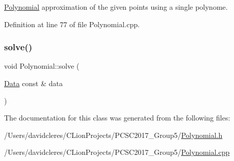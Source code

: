 \mbox{\hyperlink{class_polynomial}{Polynomial}} approximation of the given points using a single polynome. 



Definition at line 77 of file Polynomial.\+cpp.

\mbox{\label{class_polynomial_a15351ca59ae2e3a6a8b8b1ec4e23a924}} 
\subsubsection{\texorpdfstring{solve()}{solve()}\hspace{0.1cm}{\footnotesize\ttfamily [3/3]}}
{\footnotesize\ttfamily void Polynomial\+::solve (\begin{DoxyParamCaption}\item[{\mbox{\hyperlink{struct_data}{Data}} const \&}]{data }\end{DoxyParamCaption})}



The documentation for this class was generated from the following files\+:\begin{DoxyCompactItemize}
\item 
/\+Users/davidcleres/\+C\+Lion\+Projects/\+P\+C\+S\+C2017\+\_\+\+Group5/\mbox{\hyperlink{_polynomial_8h}{Polynomial.\+h}}\item 
/\+Users/davidcleres/\+C\+Lion\+Projects/\+P\+C\+S\+C2017\+\_\+\+Group5/\mbox{\hyperlink{_polynomial_8cpp}{Polynomial.\+cpp}}\end{DoxyCompactItemize}
